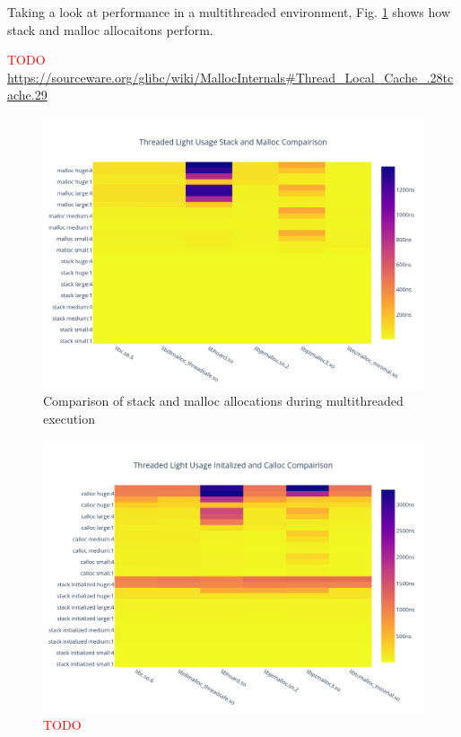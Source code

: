 \documentclass[letterpaper, 10 pt, conference]{ieeeconf}  %
\newcommand*\todo[0]{\textcolor{red}{TODO }}
\begin{document}
Taking a look at performance in a multithreaded environment, Fig. \ref{algo1_stack_malloc_threaded_hist} shows how stack and malloc allocaitons perform.

\todo \url{https://sourceware.org/glibc/wiki/MallocInternals#Thread_Local_Cache_.28tcache.29}

\begin{figure}[tbh!]
  \centering
  \includegraphics[width=\columnwidth]{graphs/light_stack_malloc_threaded_hist.png}
  \caption{ Comparison of stack and malloc allocations during multithreaded execution }
  \label{algo1_stack_malloc_threaded_hist}
\end{figure}

\begin{figure}[tbh!]
  \centering
  \includegraphics[width=\columnwidth]{graphs/light_init_calloc_threaded_hist.png}
  \caption{ \todo }
  \label{algo1_init_calloc_threaded_hist}
\end{figure}
\end{document}
